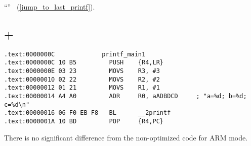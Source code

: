``\SwitchCaseDefaultSectionName'' 
~(\ref{jump_to_last_printf}).

\subsection{\OptimizingKeil + \ThumbMode}

\begin{lstlisting}[caption=\OptimizingKeil + \ThumbMode]
.text:0000000C             printf_main1
.text:0000000C 10 B5         PUSH    {R4,LR}
.text:0000000E 03 23         MOVS    R3, #3
.text:00000010 02 22         MOVS    R2, #2
.text:00000012 01 21         MOVS    R1, #1
.text:00000014 A4 A0         ADR     R0, aADBDCD     ; "a=%d; b=%d; c=%d\n"
.text:00000016 06 F0 EB F8   BL      __2printf
.text:0000001A 10 BD         POP     {R4,PC}
\end{lstlisting}

{There is no significant difference from the non-optimized code for ARM mode}.


